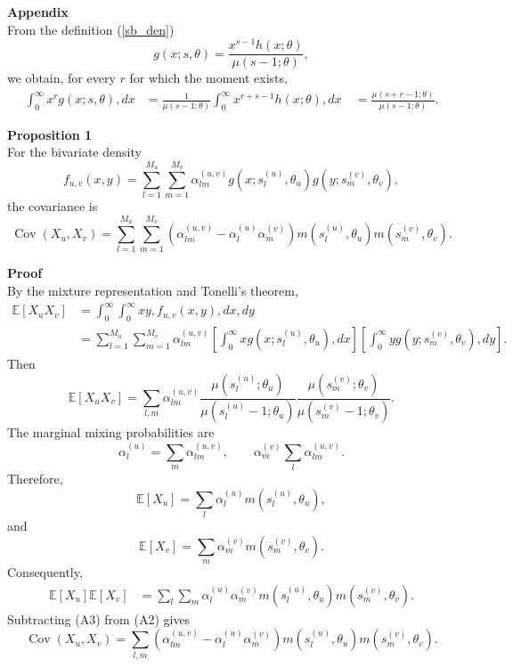 \documentclass[11pt]{article}
\begin{document}
\newpage




\newpage


\textbf{Appendix}\\

From the definition (\ref{sb_den})
\[
g(x;s,\theta) =\frac{x^{s-1}h(x;\theta)}{\mu(s-1;\theta)},
\]
we obtain, for every $r$ for which the moment exists,
\[
\begin{aligned}
\int_0^\infty x^r g(x;s,\theta),dx 
&=
\frac{1}{\mu(s-1;\theta)}
\int_0^\infty x^{r+s-1}h(x;\theta),dx\
&=
\frac{\mu(s+r-1;\theta)}{\mu(s-1;\theta)}.
\end{aligned}
\tag{A1}
\]

\textbf{Proposition 1}\\

For the bivariate density 
\[ f_{u,v}(x,y) =
\sum_{l=1}^{M_u}\sum_{m=1}^{M_v} \alpha^{(u,v)}_{lm} g(x;s_l^{(u)},\theta_u) g(y;s_m^{(v)},\theta_v), \] 
the covariance is 
\[ \operatorname{Cov}(X_u,X_v) =
\sum_{l=1}^{M_u}\sum_{m=1}^{M_v}
\left(
\alpha^{(u,v)}_{lm}
-\alpha_l^{(u)}\alpha_m^{(v)}
\right)
m(s_l^{(u)},\theta_u)m(s_m^{(v)},\theta_v).
\]

\textbf{Proof}\\

By the mixture representation and Tonelli’s theorem, 
\[
 \begin{aligned} \mathbb E[X_uX_v] &= \int_0^\infty\int_0^\infty xy,f_{u,v}(x,y),dx,dy\\ 
&= \sum_{l=1}^{M_u}\sum_{m=1}^{M_v} \alpha^{(u,v)}_{lm} \left[ \int_0^\infty xg(x;s_l^{(u)},\theta_u),dx \right] \left[ \int_0^\infty yg(y;s_m^{(v)},\theta_v),dy \right]. 
\end{aligned} 
\] 
Then  
\[ \mathbb E[X_uX_v] =
\sum_{l,m}
\alpha^{(u,v)}_{lm}
\frac{\mu(s_l^{(u)};\theta_u)}
     {\mu(s_l^{(u)}-1;\theta_u)}
\frac{\mu(s_m^{(v)};\theta_v)}
     {\mu(s_m^{(v)}-1;\theta_v)}.
\tag{A2}
\]
The marginal mixing probabilities are 
\[ \alpha_l^{(u)} =
\sum_m\alpha_{lm}^{(u,v)}, \qquad \alpha_m^{(v)}
\sum_l\alpha_{lm}^{(u,v)}. \] 
Therefore, 
\[ \mathbb E[X_u] =
\sum_l\alpha_l^{(u)}m(s_l^{(u)},\theta_u), \] and 
\[ \mathbb E[X_v] =
\sum_m\alpha_m^{(v)}m(s_m^{(v)},\theta_v).
\]
Consequently,
\[
\begin{aligned}
\mathbb E[X_u]\mathbb E[X_v]
&=
\sum_l\sum_m
\alpha_l^{(u)}\alpha_m^{(v)}
m(s_l^{(u)},\theta_u)m(s_m^{(v)},\theta_v).
\end{aligned}
\tag{A3}
\]
Subtracting (A3) from (A2) gives 
\[  \operatorname{Cov}(X_u,X_v) =
\sum_{l,m}
\left(
\alpha^{(u,v)}_{lm}
-\alpha_l^{(u)}\alpha_m^{(v)}
\right)
m(s_l^{(u)},\theta_u)m(s_m^{(v)},\theta_v).
\]
\end{document}
